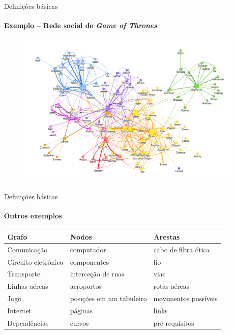 \begin{frame}{Definições básicas}
	\framesubtitle{Exemplo -- Rede social de \textit{Game of Thrones}}

	\begin{figure}
		\centering
		\includegraphics[width=0.9\linewidth]{img/graph-of-thrones}
	\end{figure}
\end{frame}



\begin{frame}{Definições básicas}
	\framesubtitle{Outros exemplos}

	\begin{table}
		\centering
		\begin{tabular}{lll}
			\hline
			\textbf{Grafo} & \textbf{Nodos} & \textbf{Arestas} \\
			\hline
			Comunicação & computador & cabo de fibra ótica \\
			Circuito eletrônico & componentes & fio \\
			Transporte & interceção de ruas & vias \\
			Linhas aéreas & aeroportos & rotas aéreas \\
			Jogo & posições em um tabuleiro & movimentos possíveis \\
			Internet & páginas & links \\
			Dependências & cursos & pré-requisitos \\
			\hline
		\end{tabular}
	\end{table}
\end{frame}



